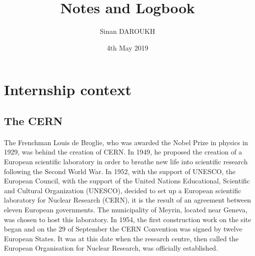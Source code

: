 \documentclass[a4paper, 12pt]{article}
\title{Notes and Logbook}
\author{Sinan DAROUKH}
\date{4th May 2019}
\begin{document}
\begin{titlepage}
\maketitle
\end{titlepage}


\renewcommand{\contentsname}{Table of contents}
\tableofcontents
\newpage
\renewcommand{\listfigurename}{Table of figures and illustrations}
\listoffigures
\newpage



\newpage
\section{Internship context}
\subsection{The CERN}
\paragraph{}
The Frenchman Louis de Broglie, who was awarded the Nobel Prize in physics in 1929, was behind the creation of CERN. 
In 1949, he proposed the creation of a European scientific laboratory in order to breathe new life into scientific research following the Second World War. 
In 1952, with the support of UNESCO, the European Council, with the support of the United Nations Educational, Scientific and Cultural Organization (UNESCO), decided to set up a European scientific laboratory for Nuclear Research (CERN), it is the result of an agreement between eleven European governments. 
The municipality of Meyrin, located near Geneva, was chosen to host this laboratory.
In 1954, the first construction work on the site began and on the 29 of September the CERN Convention was signed by twelve European States. 
It was at this date when the research centre, then called the European Organisation for Nuclear Research, was officially established.
\end{document}
